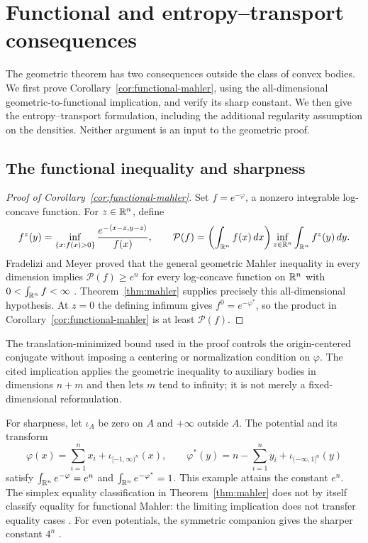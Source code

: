 \section{Functional and entropy--transport consequences}\label{sec:consequences}

The geometric theorem has two consequences outside the class of convex
bodies. We first prove Corollary~\ref{cor:functional-mahler}, using the
all-dimensional geometric-to-functional implication, and verify its
sharp constant. We then give the entropy--transport formulation, including
the additional regularity assumption on the densities. Neither argument
is an input to the geometric proof.

\subsection{The functional inequality and sharpness}

\begin{proof}[Proof of Corollary~\ref{cor:functional-mahler}]
Set $f=e^{-\varphi}$, a nonzero integrable log-concave function. For
$z\in\mathbb R^n$, define
\[
 f^z(y)=\inf_{\{x:f(x)>0\}}
        \frac{e^{-\langle x-z,y-z\rangle}}{f(x)},
 \qquad
 \mathcal P(f)=
 \left(\int_{\mathbb R^n}f(x)\,dx\right)
 \inf_{z\in\mathbb R^n}\int_{\mathbb R^n}f^z(y)\,dy.
\]
Fradelizi and Meyer proved that the general geometric Mahler inequality
in every dimension implies $\mathcal P(f)\ge e^n$ for every log-concave
function on $\mathbb R^n$ with $0<\int_{\mathbb R^n}f<\infty$
\cite[Proposition~2(a)]{FradeliziMeyer2008}.
Theorem~\ref{thm:mahler} supplies precisely this all-dimensional
hypothesis. At $z=0$ the defining infimum gives $f^0=e^{-\varphi^*}$, so
the product in Corollary~\ref{cor:functional-mahler} is at least $\mathcal P(f)$.
\end{proof}

The translation-minimized bound used in the proof controls the
origin-centered conjugate without imposing a centering or normalization
condition on $\varphi$. The cited implication applies the geometric inequality
to auxiliary bodies in dimensions $n+m$ and then lets $m$ tend to
infinity; it is not merely a fixed-dimensional reformulation.

For sharpness, let $\iota_A$ be zero on $A$ and $+\infty$ outside $A$.
The potential and its transform
\[
 \varphi(x)=\sum_{i=1}^n x_i+\iota_{[-1,\infty)^n}(x),
 \qquad
 \varphi^*(y)=n-\sum_{i=1}^n y_i+\iota_{(-\infty,1]^n}(y)
\]
satisfy $\int_{\mathbb R^n}e^{-\varphi}=e^n$ and $\int_{\mathbb R^n}e^{-\varphi^*}=1$.
This example attains the constant $e^n$. The simplex equality classification in
Theorem~\ref{thm:mahler} does not by itself classify equality for
functional Mahler: the limiting implication does not transfer equality
cases \cite[p.~1437]{FradeliziMeyer2008}.
For even potentials, the symmetric companion gives the sharper
constant $4^n$ \cite[Corollary~1.2]{OpenAISymmetricMahler2026}.

